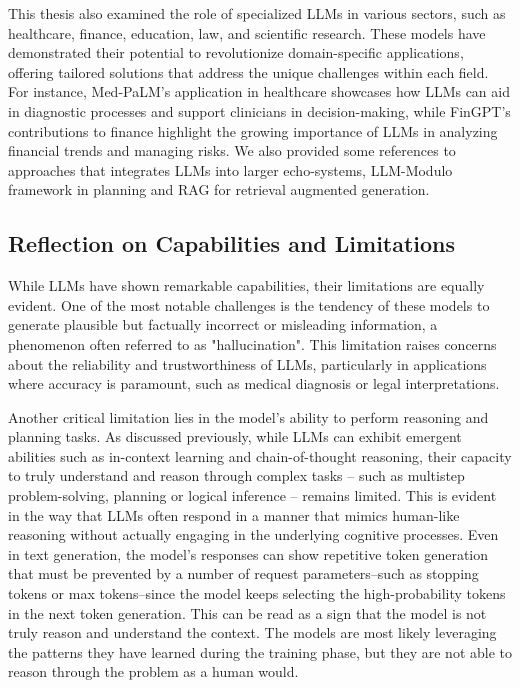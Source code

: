 This thesis also examined the role of specialized LLMs in various sectors, such as healthcare, finance, education, law, and scientific research.
These models have demonstrated their potential to revolutionize domain-specific applications, offering tailored solutions that address the unique challenges within each field.
For instance, Med-PaLM's application in healthcare showcases how LLMs can aid in diagnostic processes and support clinicians in decision-making, while FinGPT's contributions to finance highlight the growing importance of LLMs in analyzing financial trends and managing risks.
We also provided some references to approaches that integrates LLMs into larger echo-systems, LLM-Modulo framework in planning and RAG for retrieval augmented generation.

\subsection*{Reflection on Capabilities and Limitations}
While LLMs have shown remarkable capabilities, their limitations are equally evident.
One of the most notable challenges is the tendency of these models to generate plausible but factually incorrect or misleading information, a phenomenon often referred to as "hallucination".
This limitation raises concerns about the reliability and trustworthiness of LLMs, particularly in applications where accuracy is paramount, such as medical diagnosis or legal interpretations.

Another critical limitation lies in the model's ability to perform reasoning and planning tasks.
As discussed previously, while LLMs can exhibit emergent abilities such as in-context learning and chain-of-thought reasoning, their capacity to truly understand and reason through complex tasks -- such as multistep problem-solving, planning or logical inference -- remains limited.
This is evident in the way that LLMs often respond in a manner that mimics human-like reasoning without actually engaging in the underlying cognitive processes.
Even in text generation, the model's responses can show repetitive token generation that must be prevented by a number of request parameters--such as stopping tokens or max tokens--since the model keeps selecting the high-probability tokens in the next token generation.
This can be read as a sign that the model is not truly reason and understand the context.
The models are most likely leveraging the patterns they have learned during the training phase, but they are not able to reason through the problem as a human would.

